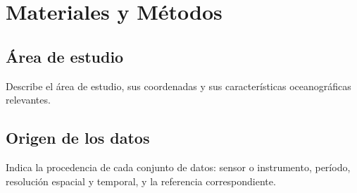 %

\chapter{Materiales y Métodos}

\section{Área de estudio}

Describe el área de estudio, sus coordenadas y sus características
oceanográficas relevantes.

%
%
%
%

\section{Origen de los datos}

Indica la procedencia de cada conjunto de datos: sensor o instrumento, período,
resolución espacial y temporal, y la referencia correspondiente.

%
%


